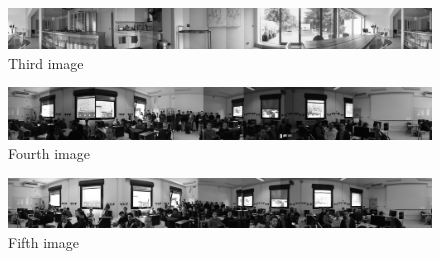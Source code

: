 \begin{figure}[h]
	\centering
        \begin{minipage}{1\textwidth}
        		\centering
		\includegraphics[width=\linewidth]{images/source/3}
		\caption{Third image}
		\label{fig:1c}
        \end{minipage}
\end{figure}

\begin{figure}[h]
	\centering
        \begin{minipage}{1\textwidth}
        		\centering
		\includegraphics[width=\linewidth]{images/source/4}
		\caption{Fourth image}
		\label{fig:1d}
        \end{minipage}
\end{figure}

\begin{figure}[h]
	\centering
        \begin{minipage}{1\textwidth}
        		\centering
		\includegraphics[width=\linewidth]{images/source/5}
		\caption{Fifth image}
		\label{fig:1e}
        \end{minipage}
\end{figure}


